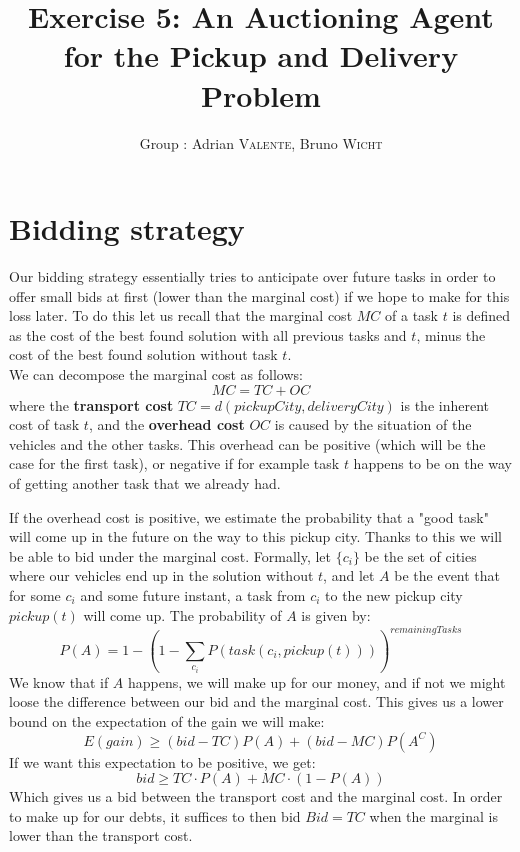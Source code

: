 \documentclass[11pt]{article}
\title{\bf Exercise 5: An Auctioning Agent for the Pickup and Delivery Problem}
\author{Group \textnumero 4: Adrian \textsc{Valente}, Bruno \textsc{Wicht}}
\begin{document}
\maketitle

\section{Bidding strategy}
Our bidding strategy essentially tries to anticipate over future tasks in order to offer small bids at first (lower than the marginal cost) if we hope to make for this loss later. To do this let us recall that the marginal cost $MC$ of a task $t$ is defined as the cost of the best found solution with all previous tasks and $t$, minus the cost of the best found solution without task $t$.
\\

We can decompose the marginal cost as follows:
$$ MC = TC + OC$$
where the \textbf{transport cost} $TC = d(pickupCity, deliveryCity)$ is the inherent cost of task $t$, and the \textbf{overhead cost} $OC$ is caused by the situation of the vehicles and the other tasks.  This overhead can be positive (which will be the case for the first task), or negative if for example task $t$ happens to be on the way of getting another task that we already had.

If the overhead cost is positive, we estimate the probability that a "good task" will come up in the future on the way to this pickup city. Thanks to this we will be able to bid under the marginal cost. Formally, let $\{c_i\}$ be the set of cities where our vehicles end up in the solution without $t$, and let $A$ be the event that for some $c_i$ and some future instant, a task from $c_i$ to the new pickup city $pickup(t)$ will come up. The probability of $A$ is given by:
\begin{equation}\label{proba} P(A) = 1 - (1 - \sum_{c_i} P(task(c_i, pickup(t))))^{remainingTasks}\end{equation}
We know that if $A$ happens, we will make up for our money, and if not we might loose the difference between our bid and the marginal cost.  This gives us a lower bound on the expectation of the gain we will make:
$$ E(gain) \geq (bid - TC)P(A) + (bid - MC)P(A^{C})$$
If we want this expectation to be positive, we get:
$$ bid \geq TC\cdot P(A) + MC\cdot (1-P(A)) $$
Which gives us a bid between the transport cost and the marginal cost. In order to make up for our debts, it suffices to then bid $ Bid = TC$
when the marginal is lower than the transport cost.
  
\end{document}
